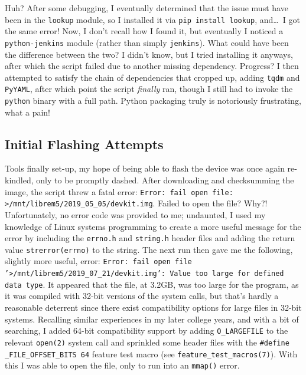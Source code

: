 \documentclass{article}
\begin{document}
Huh?  After some debugging, I eventually determined that the issue must have been in the \texttt{lookup} module, so I installed it via \texttt{pip install lookup}, and\ldots~I got the same error!  Now, I don't recall how I found it, but eventually I noticed a \texttt{python-jenkins} module (rather than simply \texttt{jenkins}).  What could have been the difference between the two?  I didn't know, but I tried installing it anyways, after which the script failed due to another missing dependency.  Progress?  I then attempted to satisfy the chain of dependencies that cropped up, adding \texttt{tqdm} and \texttt{PyYAML}, after which point the script \emph{finally} ran, though I still had to invoke the \texttt{python} binary with a full path.  Python packaging truly is notoriously frustrating, what a pain!

\subsection{Initial Flashing Attempts}
Tools finally set-up, my hope of being able to flash the device was once again re-kindled, only to be promptly dashed.  After downloading and checksumming the image, the script threw a fatal error: \texttt{Error: fail open file: >/mnt/librem5/2019_05_05/devkit.img}.  Failed to open the file?  Why?!  Unfortunately, no error code was provided to me; undaunted, I used my knowledge of Linux systems programming to create a more useful message for the error by including the \texttt{errno.h} and \texttt{string.h} header files and adding the return value \texttt{strerror(errno)} to the string.  The next run then gave me the following, slightly more useful, error: \texttt{Error: fail open file '>/mnt/librem5/2019_07_21/devkit.img': Value too large for defined data type}.  It appeared that the file, at 3.2GB, was too large for the program, as it was compiled with 32-bit versions of the system calls, but that's hardly a reasonable deterrent since there exist compatibility options for large files in 32-bit systems.  Recalling similar experiences in my later college years, and with a bit of searching, I added 64-bit compatibility support by adding \texttt{O_LARGEFILE} to the relevant \texttt{open(2)} system call and sprinkled some header files with the \texttt{#define _FILE_OFFSET_BITS 64} feature test macro (see \texttt{feature_test_macros(7)}).  With this I was able to open the file, only to run into an \texttt{mmap()} error.
\end{document}
